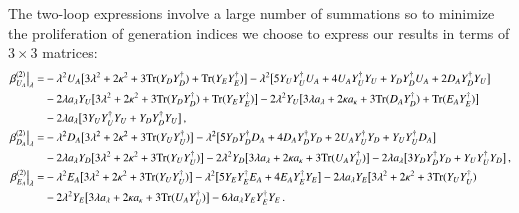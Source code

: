 \documentclass[final,3p,times,pdflatex]{elsarticle}
\newcommand{\lamsq}{\lambda^2}
\newcommand{\kapsq}{\kappa^2}
\newcommand{\tr}{\mathrm{Tr}}
\begin{document}
The two-loop expressions involve a large number of summations so to minimize the proliferation of generation indices we choose to express our results in terms of $3\times 3$ matrices:
%
\begin{align}
\left.\beta_{ U_A}^{(2)}\right|_\lambda =& -\lamsq U_A\big[ 3\lamsq + 2\kapsq 
+ 3\tr( Y_D Y_D^\dagger) + \tr( Y_E Y_E^\dagger) \big] 
-\lamsq\big[ 5 Y_U Y_U^\dagger U_A + 4 U_A Y_U^\dagger Y_U +  Y_D Y_D^\dagger U_A 
+ 2 D_A Y_D^\dagger Y_U \big] \notag \\
%
&-2\lambda  a_\lambda Y_U\big[ 3\lamsq + 2\kapsq + 3\tr( Y_D Y_D^\dagger) 
+ \tr( Y_E Y_E^\dagger) \big] -2\lamsq Y_U\big[ 3\lambda  a_\lambda 
+ 2\kappa a_\kappa + 3\tr( D_A Y_D^\dagger) + \tr( E_A Y_E^\dagger) \big] \notag \\
%
&-2\lambda  a_\lambda\big[ 3 Y_U Y_U^\dagger Y_U +  Y_D Y_D^\dagger Y_U \big]\,, \\
%
%
\left.\beta_{ D_A}^{(2)}\right|_\lambda =& -\lamsq D_A\big[ 3\lamsq + 2\kapsq 
+ 3\tr( Y_U Y_U^\dagger) \big] 
-\lamsq\big[ 5 Y_D Y_D^\dagger D_A + 4 D_A Y_D^\dagger Y_D + 2 U_A Y_U^\dagger Y_D 
+  Y_U Y_U^\dagger D_A \big] \notag \\
%
&-2\lambda  a_\lambda  Y_D\big[ 3\lamsq + 2\kapsq + 3\tr( Y_U Y_U^\dagger) \big]
-2\lamsq Y_D\big[ 3\lambda  a_\lambda + 2\kappa a_\kappa 
+ 3\tr( U_A Y_U^\dagger) \big] -2\lambda  a_\lambda\big[ 3 Y_D Y_D^\dagger Y_D 
+  Y_U Y_U^\dagger Y_D\big]\,,  \\
%
%
\left.\beta_{ E_A}^{(2)}\right|_\lambda =& -\lamsq  E_A\big[ 3\lamsq + 2\kapsq 
+ 3\tr( Y_U Y_U^\dagger) \big] 
-\lamsq\big[ 5 Y_E Y_E^\dagger E_A + 4 E_A Y_E^\dagger Y_E \big] 
-2\lambda  a_\lambda  Y_E\big[ 3\lamsq + 2\kapsq + 3\tr( Y_U Y_U^\dagger) \notag \\
%
&-2\lamsq Y_E\big[ 3\lambda a_\lambda + 2\kappa a_\kappa + 3\tr( U_A Y_U^\dagger) 
\big] -6\lambda a_\lambda  Y_E Y_E^\dagger Y_E\,.
\end{align}
\end{document}
